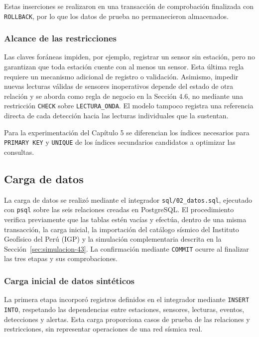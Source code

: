 \documentclass[12pt,a4paper]{article}
\begin{document}
Estas inserciones se realizaron en una transacción de comprobación
 finalizada con \texttt{ROLLBACK}, por lo que los datos de prueba
 no permanecieron almacenados.

\subsubsection*{Alcance de las restricciones}

Las claves foráneas impiden, por ejemplo, registrar un sensor sin
 estación, pero no garantizan que toda estación cuente con al menos
 un sensor. Esta última regla requiere un mecanismo adicional de
 registro o validación. Asimismo, impedir nuevas lecturas válidas
 de sensores inoperativos depende del estado de otra relación y
 se aborda como regla de negocio en la Sección 4.6, no mediante
 una restricción \texttt{CHECK} sobre \texttt{LECTURA\_ONDA}.
 El modelo tampoco registra una referencia directa de cada detección
 hacia las lecturas individuales que la sustentan.

Para la experimentación del Capítulo 5 se diferencian los índices
 necesarios para \texttt{PRIMARY KEY} y \texttt{UNIQUE} de los
 índices secundarios candidatos a optimizar las consultas.



\subsection{Carga de datos}\label{sec:carga-datos-42}

La carga de datos se realizó mediante el integrador
\texttt{sql/02\_datos.sql}, ejecutado con \texttt{psql} sobre las seis
relaciones creadas en PostgreSQL. El procedimiento verifica previamente
que las tablas estén vacías y efectúa, dentro de una misma transacción,
la carga inicial, la importación del catálogo sísmico del Instituto
Geofísico del Perú (IGP) y la simulación complementaria descrita en
la Sección~\ref{sec:simulacion-43}. La confirmación mediante
\texttt{COMMIT} ocurre al finalizar las tres etapas y sus comprobaciones.

\subsubsection*{Carga inicial de datos sintéticos}

La primera etapa incorporó registros definidos en el integrador mediante
\texttt{INSERT INTO}, respetando las dependencias entre estaciones,
sensores, lecturas, eventos, detecciones y alertas. Esta carga proporciona
casos de prueba de las relaciones y restricciones, sin representar
operaciones de una red sísmica real.
\end{document}
